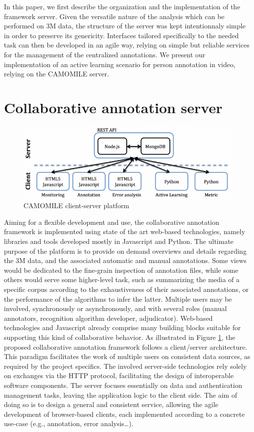 \documentclass[10pt, a4paper]{article}
\begin{document}
In this paper, we first describe the organization and the implementation of the framework server. Given the versatile nature of the analysis which can be performed on 3M data, the structure of the server was kept intentionnaly simple in order to preserve its genericity. Interfaces tailored specifically to the needed task can then be developed in an agile way, relying on simple but reliable services for the management of the centralized annotations. We present our implementation of an active learning scenario for person annotation in video, relying on the CAMOMILE server. 

\section{Collaborative annotation server}

\begin{figure}[htb]
 \center 
 \includegraphics[width=0.8\linewidth]{figs/archi.png}
 \centering
 \caption {CAMOMILE client-server platform}
 \label{fig:archi}
\end{figure}

Aiming for a flexible development and use, the collaborative annotation framework is implemented using state of the art web-based technologies, namely libraries and tools developed mostly in Javascript and Python. The ultimate purpose of the platform is to provide on demand overviews and details regarding the 3M data, and the associated automatic and manual annotations. Some views would be dedicated to the fine-grain inspection of annotation files, while some others would serve some higher-level task, such as summarizing the media of a specific corpus according to the exhaustiveness of their associated annotations, or the performance of the algorithms to infer the latter. Multiple users may be involved, synchronously or asynchronously, and with several roles (manual annotators, recognition algorithm developer, adjudicator). Web-based technologies and Javascript already comprise many building blocks suitable for supporting this kind of collaborative behavior. As illustrated in Figure \ref{fig:archi}, the proposed collaborative annotation framework follows a client/server architecture. This paradigm facilitates the work of multiple users on consistent data sources, as required by the project specifics. The involved server-side technologies rely solely on exchanges via the HTTP protocol, facilitating the design of interoperable software components. The server focuses essentially on data and authentication management tasks, leaving the application logic to the client side. The aim of doing so is to design a general and consistent service, allowing the agile development of browser-based clients, each implemented according to a concrete use-case (e.g., annotation, error analysis…).
\end{document}
